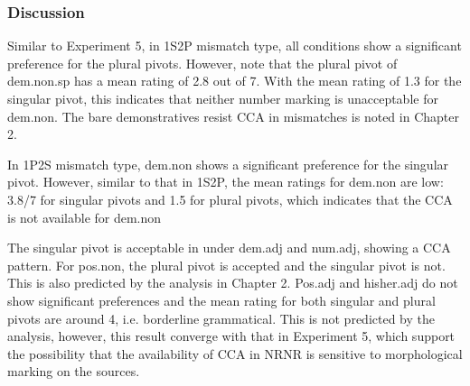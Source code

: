 \documentclass[
  11pt          %
  ,letterpaper  %
  ,center       %
  ,noupper      %
  ]{uconnthesis2}
\begin{document}

\subsubsection{Discussion}

Similar to Experiment 5, in 1S2P mismatch type, all conditions show a significant preference for the plural pivots. However, note that the plural pivot of dem.non.sp has a mean rating of 2.8 out of 7. With the mean rating of 1.3 for the singular pivot, this indicates that neither number marking is unacceptable for dem.non. The bare demonstratives resist CCA in mismatches is noted in Chapter 2. 

In 1P2S mismatch type, dem.non shows a significant preference for the singular pivot. However, similar to that in 1S2P, the mean ratings for dem.non are low: 3.8/7 for singular pivots and 1.5 for plural pivots, which indicates that the CCA is not available for dem.non

The singular pivot is acceptable in under dem.adj and num.adj, showing a CCA pattern. For pos.non, the plural pivot is accepted and the singular pivot is not. This is also predicted by the analysis in Chapter 2. Pos.adj and hisher.adj do not show significant preferences and the mean rating for both singular and plural pivots are around 4, i.e. borderline grammatical. This is not predicted by the analysis, however, this result converge with that in Experiment 5, which support the possibility that the availability of CCA in NRNR is sensitive to morphological marking on the sources. 
\end{document}
